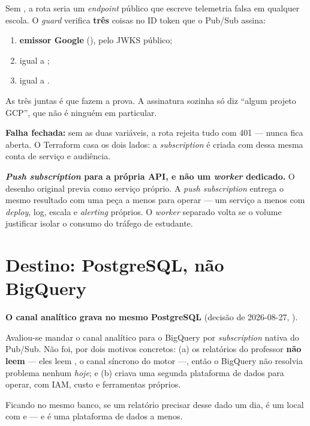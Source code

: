 \begin{regra}
Sem , a rota seria um \emph{endpoint} público que escreve
telemetria falsa em qualquer escola. O \emph{guard} verifica \textbf{três} coisas
no ID token que o Pub/Sub assina:

\begin{enumerate}
  \item \textbf{emissor Google} (), pelo JWKS público;
  \item {} igual a ;
  \item {} igual a .
\end{enumerate}

As três juntas é que fazem a prova. A assinatura sozinha só diz \enquote{algum
projeto GCP}, que não é ninguém em particular.

\textbf{Falha fechada:} sem as duas variáveis, a rota rejeita tudo com 401 ---
nunca fica aberta. O Terraform casa os dois lados: a \emph{subscription} é criada
com  dessa mesma conta de serviço e audiência.
\end{regra}

\begin{decisao}
\textbf{\emph{Push subscription} para a própria API, e não um \emph{worker}
dedicado.} O desenho original previa
 como serviço próprio. A \emph{push
subscription} entrega o mesmo resultado com uma peça a menos para operar --- um
serviço a menos com \emph{deploy}, log, escala e \emph{alerting} próprios. O
\emph{worker} separado volta se o volume justificar isolar o consumo do tráfego
de estudante.
\end{decisao}

\section{Destino: PostgreSQL, não BigQuery}

\begin{decisao}
\textbf{O canal analítico grava no mesmo PostgreSQL} (decisão de 2026-08-27,
).

Avaliou-se mandar o canal analítico para o BigQuery por \emph{subscription}
nativa do Pub/Sub. Não foi, por dois motivos concretos: (a) os relatórios do
professor \textbf{não leem}  --- eles leem
, o canal síncrono do motor ---, então o BigQuery não
resolvia problema nenhum \emph{hoje}; e (b) criava uma segunda plataforma de
dados para operar, com IAM, custo e ferramentas próprios.

Ficando no mesmo banco, se um relatório precisar desse dado um dia, é um
 local com  e  --- e é uma plataforma de dados a
menos.
\end{decisao}

